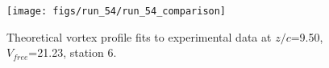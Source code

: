 \begin{figure}[H]
\centering
\texttt{[image: figs/run\_54/run\_54\_comparison]}
\caption{Theoretical vortex profile fits to experimental data at $z/c$=9.50, $V_{free}$=21.23, station 6.}
\end{figure}


